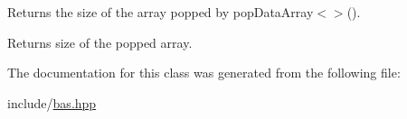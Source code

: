 Returns the size of the array popped by pop\+Data\+Array$<$$>$(). 

\begin{DoxyReturn}{Returns}
size of the popped array. 
\end{DoxyReturn}


The documentation for this class was generated from the following file\+:\begin{DoxyCompactItemize}
\item 
include/\mbox{\hyperlink{bas_8hpp}{bas.\+hpp}}\end{DoxyCompactItemize}
